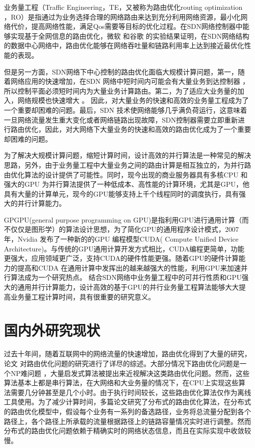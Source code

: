 \documentclass[master]{thesis-uestc}
\begin{document}
业务量工程（Traffic Engineering，TE，又被称为路由优化routing optimization ，RO）是指通过为业务选择合理的网络路由来达到充分利用网络资源，最小化网络代价，提高网络性能，满足Qos需要等目标的优化过程。在SDN网络控制器中能够实现基于全网信息的路由优化，微软 和谷歌 的实验结果证明，在SDN网络结构的数据中心网络中，路由优化能够在网络吞吐量和链路利用率上达到接近最优化性能的表现。

但是另一方面，SDN网络下中心控制的路由优化面临大规模计算问题，第一，随着网络应用的快速增加，在SDN 网络中短时间内可能会有大量业务到达控制器 ，所以控制平面必须短时间内为大量业务计算路由。第二，为了适应大业务量的加入，网络规模也快速增大 。 因此，对大量业务的快速和高效的业务量工程成为了一个重要却困难的问题。最后，SDN 技术使网络能够几乎满负荷运行，这意味着一旦网络流量发生重大变化或者网络链路出现故障，SDN控制器需要立即重新进行路由优化，因此，对大网络下大量业务的快速和高效的路由优化成为了一个重要却困难的问题。

为了解决大规模计算问题，缩短计算时间，设计高效的并行算法是一种常见的解决思路，另外，由于业务量工程中大量业务之间的路由计算是相互独立的，为并行路由优化算法的设计提供了可能性。同时，现今出现的商业服务器具有多核CPU 和强大的GPU 为并行算法提供了一种低成本、高性能的计算环境，尤其是GPU，他具有大量的计算单元，现今的GPU能够支持上千个线程同时的调度执行，具有强大的并行计算能力。

GPGPU(general purpose programming on GPU)是指利用GPU进行通用计算（而不仅仅是图形学）的算法设计思想，为了简化GPU的通用程序设计模式，2007 年，Nvidia 发布了一种新的的GPU 编程模型CUDA( Compute Unified Device Architecture)。与传统的GPU通用计算开发方式相比，CUDA编程更简单，功能更强大，应用领域更广泛，支持CUDA的硬件性能更强。随着GPU的硬件计算能力的提高和CUDA 在通用计算中发挥出的越来越强大的性能，利用GPU来加速并行算法成为一个研究热点。
结合SDN网络中业务量工程中的可并行性质和GPU强大的通用并行计算能力，设计高效的基于GPU的并行业务量工程算法能够大大提高业务量工程计算时间，具有很重要的研究意义。
\section{国内外研究现状}
过去十年间，随着互联网中的网络流量的快速增加，路由优化得到了大量的研究，论文 对路由优化问题的研究进行了详尽的综述。大部分情况下路由优化问题是一个NP难问题 ，大量启发式算法被提出来近视解决这类路由优化问题。然而，这些算法基本上都是串行算法，在大网络和大业务量的情况下，在CPU上实现这些算法需要几分钟甚至是几个小时。由于执行时间较长，这些路由优化算法仅作为离线工具使用。为了减少计算时间，多篇论文研究了分布式的路由优化算法，在分布式的路由优化模型中，假设每个业务有一系列的备选路径，业务将总流量分配到各个路径上，各个路径上所承载的流量根据路径上的链路容量情况实时进行调整。然而分布式的路由优化问题依赖于精确实时的网络状态信息，而且在实际实现中收敛较慢。
\end{document}
